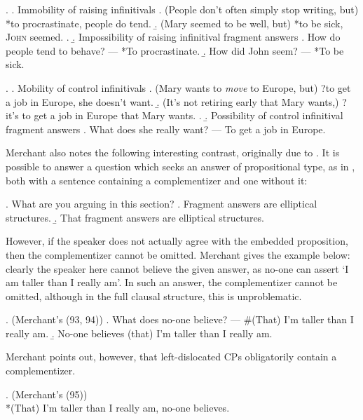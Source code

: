 \documentclass[doublespace]{umthesis}
\begin{document}
\ex. 		\a. Immobility of raising infinitivals 
			\a. (People don't often simply stop writing, but) *to procrastinate, people do tend. 
			\b. (Mary seemed to be well, but) *to be sick, \textsc{John} seemed.
			\z. 
		\b. Impossibility of raising infinitival fragment answers
			\a. How do people tend to behave? --- *To procrastinate. 
			\b. How did John seem? --- *To be sick.
			
\ex. 		\a. Mobility of control infinitivals
			\a. (Mary wants to \emph{move} to Europe, but) ?to get a job in Europe, she doesn't want. 
			\b. (It's not retiring early that Mary wants,) ?it's to get a job in Europe that Mary wants.
			\z. 
		\b. Possibility of control infinitival fragment answers
			\a. What does she really want? --- To get a job in Europe.
			
Merchant also notes the following interesting contrast, originally due to \cite{Mor73}. It is possible to answer a question which seeks an answer of propositional type, as in \Next[a], both with a sentence containing a complementizer and one without it:

\ex. 	What are you arguing in this section?
		 \a. Fragment answers are elliptical structures. \label{nonCanswer}
		\b. That fragment answers are elliptical structures.
		
However, if the speaker does not actually agree with the embedded proposition, then the complementizer cannot be omitted. Merchant gives the example below: clearly the speaker here cannot believe the given answer, as no-one can assert `I am taller than I really am'. In such an answer, the complementizer cannot be omitted, although in the full clausal structure, this is unproblematic.

\ex. 		(Merchant's (93, 94))
		\a. What does no-one believe? --- \#(That) I'm taller than I really am.
		\b. No-one believes (that) I'm taller than I really am.
		
Merchant points out, however, that left-dislocated CPs obligatorily contain a complementizer.

\ex. 		(Merchant's (95))\\
		{}*(That) I'm taller than I really am, no-one believes.
		
\end{document}
